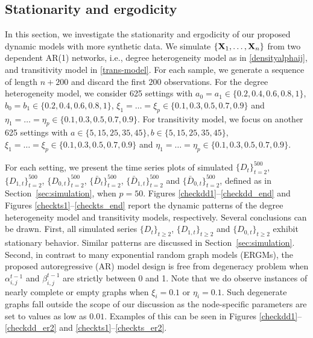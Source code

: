 \documentclass[12pt]{article}
\newcommand{\bX}{{\bf X}}
\newcommand{\0}{{\bf 0}}
\begin{document}
\begin{skip}
\subsection{Stationarity and ergodicity}%
\label{app:density-dependent}
In this section, we investigate the stationarity and ergodicity of our proposed dynamic models with more synthetic data. We simulate $\{\bX_1, \dots, \bX_n\}$ from two dependent AR(1) networks, i.e., degree heterogeneity model as in \eqref{densityalphaij}, and transitivity model in \eqref{trans-model}.
For each sample, we generate a sequence of length $n +200$ and discard the first $200$ observations. For the degree heterogeneity model, we consider 625 settings with $a_0=a_1\in\{0.2,0.4,0.6,0.8,1\}$, $ b_0=b_1\in\{0.2,0.4,0.6,0.8,1\}$, $\xi_1 = \dots= \xi_p \in \{0.1,0.3,0.5,0.7,0.9\}$ and $ \eta_1 = \dots =\eta_p \in \{0.1,0.3,0.5,0.7,0.9\}$. For transitivity model, we focus on another 625 settings with $a \in\{5,15,25,35,45\}, b \in\{5,15,25,35,45\}$, $\xi_1 = \dots =  \xi_p \in \{0.1,0.3,0.5,0.7,0.9\}$ and $ \eta_1 = \dots =\eta_p \in \{0.1,0.3,0.5,0.7,0.9\}$. 


For each setting, we present the  time series plots of simulated  $\{D_t\}_{t=2}^{500}$, $\{D_{1,t}\}_{t=2}^{500}$, $\{D_{0,t}\}_{t=2}^{500}$, $\{\bar D_t\}_{t=2}^{500}$, $\{\bar D_{1,t}\}_{t=2}^{500}$ and $\{\bar D_{0,t}\}_{t=2}^{500}$, defined as in Section~\ref{sec:simulation}, when $p = 50$. Figures \ref{checkdd1}--\ref{checkdd_end} and Figures \ref{checkts1}--\ref{checkts_end} report the dynamic patterns of the degree heterogeneity model and transitivity models, respectively. Several conclusions can be drawn. First,  all simulated series $\{D_t\}_{t\geq2}$, $\{D_{1,t}\}_{t\geq2}$ and $\{D_{0,t}\}_{t\geq2}$ exhibit stationary behavior. Similar patterns are discussed in Section~\ref{sec:simulation}. Second,  in contrast to many exponential random graph models (ERGMs), the proposed autoregressive (AR) model design is free from degeneracy problem when $\alpha_{i,j}^{t-1}$ and $\beta_{i,j}^{t-1}$ are strictly between 0 and 1.
Note that we do observe instances of nearly complete or empty graphs when $\xi_i = 0.1$ or $ \eta_i = 0.1$. Such degenerate graphs fall outside the scope of our discussion as the node-specific parameters are set to values as low as $0.01$. Examples of this can be seen in Figures \ref{checkdd1}--\ref{checkdd_er2} and \ref{checkts1}--\ref{checkts_er2}. 








\end{skip}
\end{document}
